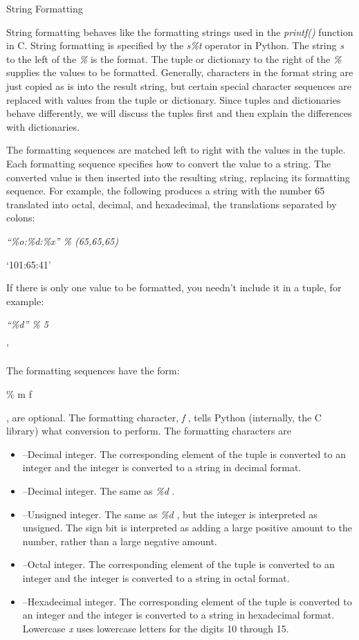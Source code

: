 String Formatting

String formatting behaves like the
formatting strings used in the \emph{printf()} function in C. String
formatting is specified by the \emph{s\%t} operator in Python. The
string \emph{s} to the left of the \emph{\%} is the format. The tuple or
dictionary to the right of the \emph{\%} supplies the values to be
formatted. Generally, characters in the format string are just copied as
is into the result string, but certain special character sequences are
replaced with values from the tuple or dictionary. Since tuples and
dictionaries behave differently, we will discuss the tuples first and
then explain the differences with dictionaries.

 The formatting
sequences are matched left to right with the values in the tuple. Each
formatting sequence specifies how to convert the value to a string. The
converted value is then inserted into the resulting string, replacing
its formatting sequence. For example, the following produces a string
with the number 65 translated into octal, decimal, and hexadecimal, the
translations separated by colons:


\emph{``\%o:\%d:\%x'' \% (65,65,65)}

`101:65:41'

If there is only one value to be
formatted, you needn't include it in a tuple, for example:


\emph{``\textbar{}\%d\textbar{}'' \% 5}

'

The formatting sequences have the
form:

\% m f

 , are
optional. The formatting character, \emph{f} , tells Python (internally,
the C library) what conversion to perform. The formatting characters are

\begin{itemize}
\tightlist
\item
   --Decimal integer. The
  corresponding element of the tuple is converted to an integer and the
  integer is converted to a string in decimal format.
\item
   --Decimal integer. The
  same as \emph{\%d} .
\item
   --Unsigned integer. The
  same as \emph{\%d} , but the integer is interpreted as unsigned. The
  sign bit is interpreted as adding a large positive amount to the
  number, rather than a large negative amount.
\item
   --Octal integer. The
  corresponding element of the tuple is converted to an integer and the
  integer is converted to a string in octal format.
\item
   --Hexadecimal integer.
  The corresponding element of the tuple is converted to an integer and
  the integer is converted to a string in hexadecimal format. Lowercase
  \emph{x} uses lowercase letters for the digits 10 through 15.
\end{itemize}


